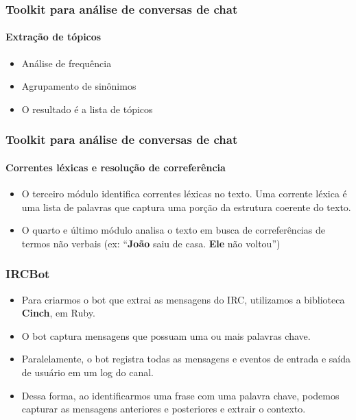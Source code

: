\documentclass{beamer}
\begin{document}

\begin{frame}
\frametitle{Toolkit para análise de conversas de chat}
\framesubtitle{Extração de tópicos}

\begin{itemize}
  \setlength\itemsep{1.2em}
  \item{Análise de frequência}
  \item{Agrupamento de sinônimos}
  \item{O resultado é a lista de tópicos}
\end{itemize}
\end{frame}


\begin{frame}
\frametitle{Toolkit para análise de conversas de chat}
\framesubtitle{Correntes léxicas e resolução de correferência}

\begin{itemize}
  \setlength\itemsep{1.2em}
  \item O terceiro módulo identifica correntes léxicas no texto. Uma corrente
  léxica é uma lista de palavras que captura uma porção da estrutura
  coerente  do texto.
  \item O quarto e último módulo analisa o texto em busca de correferências de
  termos não verbais (ex: ``\textbf{João} saiu de casa. \textbf{Ele} não voltou'')
\end{itemize}
\end{frame}


\begin{frame}
\frametitle{IRCBot}

\begin{itemize}

\item Para criarmos o bot que extrai as mensagens do IRC, utilizamos a
biblioteca \textbf{Cinch}, em Ruby.

\item O bot captura mensagens que possuam uma ou mais palavras chave.

\item Paralelamente, o bot registra todas as mensagens e eventos de entrada e
saída de usuário em um log do canal.

\item Dessa forma, ao identificarmos uma frase com uma palavra chave, podemos
capturar as mensagens anteriores e posteriores e extrair o contexto.
\end{itemize}

\end{frame}
\end{document}

